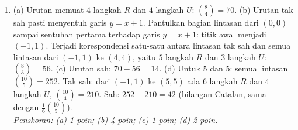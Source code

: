 \documentclass[a4paper,11pt]{article}
\newcounter{no}
\begin{document}
\begin{enumerate}[leftmargin=2em,itemsep=3pt,topsep=2pt]
\item[\textbf{5.}] (a) Urutan memuat $4$ langkah $R$ dan $4$ langkah $U$: $\binom84=70$. (b) Urutan tak sah pasti menyentuh garis $y=x+1$. Pantulkan bagian lintasan dari $(0,0)$ sampai sentuhan pertama terhadap garis $y=x+1$: titik awal menjadi $(-1,1)$. Terjadi korespondensi satu-satu antara lintasan tak sah dan semua lintasan dari $(-1,1)$ ke $(4,4)$, yaitu $5$ langkah $R$ dan $3$ langkah $U$: $\binom83=56$. (c) Urutan sah: $70-56=14$. (d) Untuk $5$ dan $5$: semua lintasan $\binom{10}5=252$. Tak sah: dari $(-1,1)$ ke $(5,5)$ ada $6$ langkah $R$ dan $4$ langkah $U$, $\binom{10}4=210$. Sah: $252-210=42$ (bilangan Catalan, sama dengan $\frac1{6}\binom{10}5$). \\ \textit{Penskoran: (a) 1 poin; (b) 4 poin; (c) 1 poin; (d) 2 poin.}
\end{enumerate}
\end{document}
